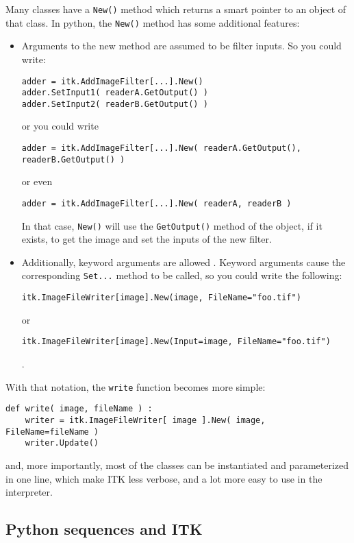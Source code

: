 \documentclass{InsightArticle}
\begin{document}
Many classes have a \verb$New()$ method which returns a smart pointer to an object of
that class. In python, the \verb$New()$ method has some additional features:
\begin{itemize}
  \item Arguments to the new method are assumed to be filter inputs. So you could
write:
\begin{verbatim}
adder = itk.AddImageFilter[...].New()
adder.SetInput1( readerA.GetOutput() )
adder.SetInput2( readerB.GetOutput() )
\end{verbatim}
or you could write
\begin{verbatim}
adder = itk.AddImageFilter[...].New( readerA.GetOutput(), readerB.GetOutput() )
\end{verbatim}
or even
\begin{verbatim}
adder = itk.AddImageFilter[...].New( readerA, readerB )
\end{verbatim}
In that case, \verb$New()$ will use the \verb$GetOutput()$ method of the object, if it
exists, to get the image and set the inputs of the new filter.

  \item Additionally, keyword arguments are allowed . Keyword arguments cause
the corresponding \verb$Set...$ method to be called, so you could write the
following:
\begin{verbatim}
itk.ImageFileWriter[image].New(image, FileName="foo.tif")
\end{verbatim}
or
\begin{verbatim}
itk.ImageFileWriter[image].New(Input=image, FileName="foo.tif")
\end{verbatim}.

\end{itemize}

With that notation, the \verb$write$ function becomes more simple:
\begin{verbatim}
def write( image, fileName ) :
    writer = itk.ImageFileWriter[ image ].New( image, FileName=fileName )
    writer.Update()
\end{verbatim}

and, more importantly, most of the classes can be instantiated and parameterized in one line,
which make ITK less verbose, and a lot more easy to use in the interpreter.


     \subsection{Python sequences and ITK}
\end{document}
